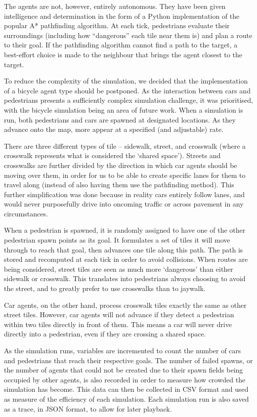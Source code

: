 The agents are not, however, entirely autonomous. They have been given intelligence and determination in the form of a Python implementation of the popular A* pathfinding algorithm. At each tick, pedestrians evaluate their surroundings (including how “dangerous” each tile near them is) and plan a route to their goal. If the pathfinding algorithm cannot find a path to the target, a best-effort choice is made to the neighbour that brings the agent closest to the target.

To reduce the complexity of the simulation, we decided that the implementation of a bicycle agent type should be postponed. As the interaction between cars and pedestrians presents a sufficiently complex simulation challenge, it was prioritised, with the bicycle simulation being an area of future work.
When a simulation is run, both pedestrians and cars are spawned at designated locations. As they advance onto the map, more appear at a specified (and adjustable) rate.

There are three different types of tile -- sidewalk, street, and crosswalk (where a crosswalk represents what is considered the `shared space'). Streets and crosswalks are further divided by the direction in which car agents should be moving over them, in order for us to be able to create specific lanes for them to travel along (instead of also having them use the pathfinding method). This further simplification was done because in reality cars entirely follow lanes, and would never purposefully drive into oncoming traffic or across pavement in any circumstances.

When a pedestrian is spawned, it is randomly assigned to have one of the other pedestrian spawn points as its goal. It formulates a set of tiles it will move through to reach that goal, then advances one tile along this path. The path is stored and recomputed at each tick in order to avoid collisions. When routes are being considered, street tiles are seen as much more `dangerous' than either sidewalk or crosswalk. This translates into pedestrians always choosing to avoid the street, and to greatly prefer to use crosswalks than to jaywalk.

Car agents, on the other hand, process crosswalk tiles exactly the same as other street tiles. However, car agents will not advance if they detect a pedestrian within two tiles directly in front of them. This means a car will never drive directly into a pedestrian, even if they are crossing a shared space.

As the simulation runs, variables are incremented to count the number of cars and pedestrians that reach their respective goals. The number of failed spawns, or the number of agents that could not be created due to their spawn fields being occupied by other agents, is also recorded in order to measure how crowded the simulation has become. This data can then be collected in CSV format and used as measure of the efficiency of each simulation. Each simulation run is also saved as a trace, in JSON format, to allow for later playback.
